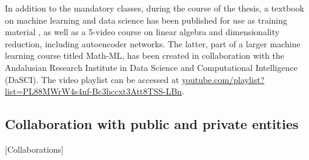\begin{table}[htbp]
    \caption[Breakdown of the subjects where the candidate taught practical lectures.]{\label{tbl:classes}Breakdown of the subjects where the candidate taught practical lectures during the doctoral period, detailing the number of groups and the total of ECTS credits. Abbreviations: Grado en Ingeniería Informática (GII), Doble Grado en Ingeniería Informática y Matemáticas (GIM).}
\end{table}



In addition to the mandatory classes, during the course of the thesis, a textbook on machine learning and data science has been published for use as training material , as well as a 5-video course on linear algebra and dimensionality reduction, including autoencoder networks. The latter, part of a larger machine learning course titled Math-ML, has been created in collaboration with the Andalusian Research Institute in Data Science and Computational Intelligence (DaSCI). The video playlist can be accessed at \href{https://www.youtube.com/playlist?list=PL88MWrW4s4nf-Bc3hccxt3Att8TSS-LBn}{youtube.com/playlist?list=PL88MWrW4s4nf-Bc3hccxt3Att8TSS-LBn}.



\subsection{Collaboration with public and private entities}[Collaborations]

